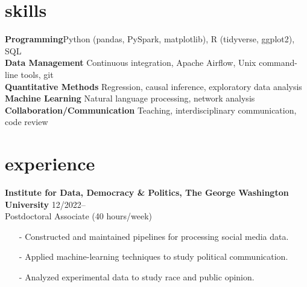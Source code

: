 \documentclass[11pt, letter]{article}
\title{}
\begin{document}
\maketitle
\section{skills}
\textbf{Programming}\hfill Python (pandas, PySpark, matplotlib), R (tidyverse, ggplot2), SQL\\ \vspace{1mm}
\textbf{Data Management} \hfill Continuous integration, Apache Airflow, Unix command-line tools, git\\\vspace{1mm}
\textbf{Quantitative Methods} \hfill Regression, causal inference, exploratory data analysis \\\vspace{1mm}
\textbf{Machine Learning} \hfill Natural language processing, network analysis\\\vspace{1mm}
\textbf{Collaboration/Communication} \hfill Teaching, interdisciplinary communication, code review


\section{experience}
\textbf{Institute for Data, Democracy \& Politics, The George Washington University} \hfill 12/2022-- \\
Postdoctoral Associate (40 hours/week) \\

\begin{itemize}[noitemsep,topsep=0pt]
\item[-] Constructed and maintained pipelines for processing social media data.
\item[-] Applied machine-learning techniques to study political communication.
\item[-] Analyzed experimental data to study race and public opinion.
\end{itemize}
\end{document}
